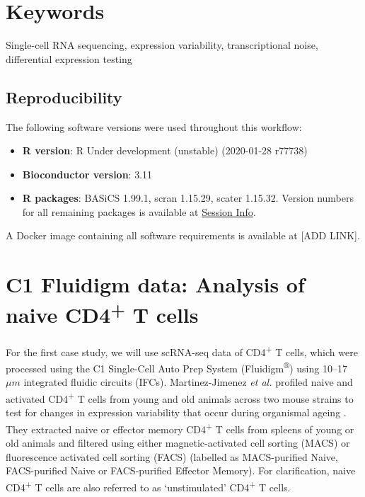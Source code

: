 \documentclass[9pt,a4paper,]{extarticle}
\begin{document}
\section*{Keywords}
Single-cell RNA sequencing, expression variability, transcriptional noise, differential expression testing


\clearpage
\pagestyle{main}

\hypertarget{reproducibility}{%
\subsection{Reproducibility}\label{reproducibility}}

The following software versions were used throughout this workflow:

\begin{itemize}
\item
  \textbf{R version}: R Under development (unstable) (2020-01-28 r77738)
\item
  \textbf{Bioconductor version}: 3.11
\item
  \textbf{R packages}: BASiCS 1.99.1, scran
  1.15.29, scater 1.15.32. Version
  numbers for all remaining packages is available at \protect\hyperlink{session-info}{Session Info}.
\end{itemize}

A Docker image containing all software requirements is available at {[}ADD LINK{]}.

\hypertarget{Tcells}{%
\section{\texorpdfstring{C1 Fluidigm data: Analysis of naive CD4\textsuperscript{+} T cells}{C1 Fluidigm data: Analysis of naive CD4+ T cells}}\label{Tcells}}

For the first case study, we will use scRNA-seq data of CD4\textsuperscript{+} T cells, which
were processed using the C1 Single-Cell Auto Prep System (Fluidigm\textsuperscript{®}) using
10--17 \(\mu{}m\) integrated fluidic circuits (IFCs).
Martinez-Jimenez \emph{et al.} profiled naive and activated CD4\textsuperscript{+} T cells from
young and old animals across two mouse strains to test for changes in
expression variability that occur during organismal ageing
\citep{Martinez-jimenez2017}. They extracted naive or effector memory CD4\textsuperscript{+} T cells
from spleens of young or old animals and filtered using either
magnetic-activated cell sorting (MACS) or fluorescence activated cell sorting
(FACS) (labelled as MACS-purified Naive, FACS-purified Naive or FACS-purified
Effector Memory).
For clarification, naive CD4\textsuperscript{+} T cells are also referred to as `unstimulated'
CD4\textsuperscript{+} T cells.
\end{document}

